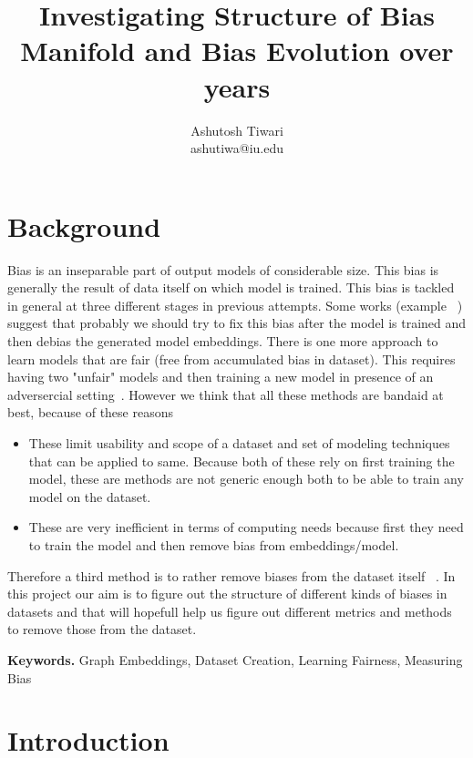 \documentclass{article}
\title{Investigating Structure of Bias Manifold and Bias Evolution over years}
\author{Ashutosh Tiwari\\
	\normalsize ashutiwa@iu.edu
}
\begin{document}
\maketitle



\section{Background}

Bias is an inseparable part of output models of considerable size. This bias is generally the result of data itself on which model is trained. This bias is tackled in general at three different stages in previous attempts. Some works (example ~\cite{DBLP:journals/corr/BolukbasiCZSK16a}) suggest that probably we should try to fix this bias after the model is trained and then debias the generated model embeddings. There is one more approach to learn models  that are fair (free from accumulated bias in dataset). This requires having two "unfair" models and then training a new model in presence of an adversercial setting~\cite{kenna_using_2021}. However we think that all these methods are bandaid at best, because of these reasons \begin{itemize}
    \item These limit usability and scope of a dataset and set of modeling techniques that can be applied to same. Because both of these rely on first training the model, these are methods are not generic enough both to be able to train any model on the dataset.
    \item These are very inefficient in terms of computing needs because first they need to train the model and then remove bias from embeddings/model.

\end{itemize}

Therefore a third method is to rather remove biases from the dataset itself ~\cite{ravfogel_null_2020}. In this project our aim is to figure out the structure of different kinds of biases in datasets and that will hopefull help us figure out different metrics and methods to remove those from the dataset.



\noindent \textbf{Keywords.} Graph Embeddings, Dataset Creation, Learning Fairness, Measuring Bias


\section{Introduction}
\end{document}

